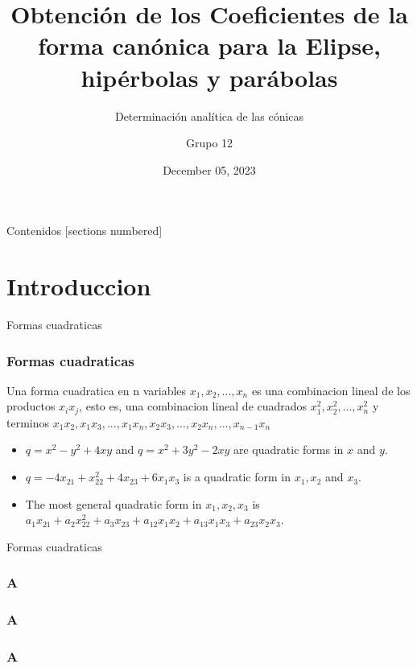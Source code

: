 \documentclass[xcolor={dvipsnames},aspectratio=169,10pt]{beamer}
\title{Obtención de los Coeficientes de la forma canónica para la Elipse, hipérbolas y parábolas}
\subtitle{Determinación analítica de las cónicas}
\author{Grupo 12}
\date{December 05, 2023}
\begin{document}
\maketitle%

\begin{frame}{Contenidos}
  [sections numbered]
  \tableofcontents[hideallsubsections]
\end{frame}

\section{Introduccion}

\begin{frame}{Formas cuadraticas}
    \frametitle{Formas cuadraticas}
    \begin{definition}
      Una forma cuadratica en n variables $x_{1}, x_{2}, . . . , x_{n}$ es una combinacion lineal de los
      productos $x_{i} x_{j}$, esto es, una combinacion lineal de cuadrados $x_{1}^2 , x_{2}^2 , . . . , x_{n}^2$ y
      terminos $x_{1}x_{2}, x_{1}x_{3}, . . . , x_{1}x_{n}, x_{2}x_{3}, . . . , x_{2}x_{n}, . . . , x_{n-1}x_{n}$
    \end{definition}

  \begin{example}
    \begin{itemize}
        \item $q = x^2 - y^2 + 4xy$ and $q = x^2 + 3y^2 - 2xy$ are quadratic forms in $x$ and $y$.
        \item $q = -4x_{21} + x_{22}^2 + 4x_{23} + 6x_{1}x_{3}$ is a quadratic form in $x_{1}, x_{2}$ and $x_{3}$.
        \item The most general quadratic form in $x_{1}, x_{2}, x_{3}$ is $a_{1}x_{21} + a_{2}x_{22}^2 + a_{3}x_{23} + a_{12}x_{1}x_{2} + a_{13}x_{1}x_{3} + a_{23}x_{2}x_{3}$.
    \end{itemize}
  \end{example}
\end{frame}

\begin{frame}[fragile]{Formas cuadraticas}
    \frametitle{A}
    \lipsum[1-1]
\end{frame}

\begin{frame}{2}
    \frametitle{A}
    \lipsum[1-1]
\end{frame}

\begin{frame}{3}
    \frametitle{A}
    \lipsum[1-1]
\end{frame}
\end{document}
